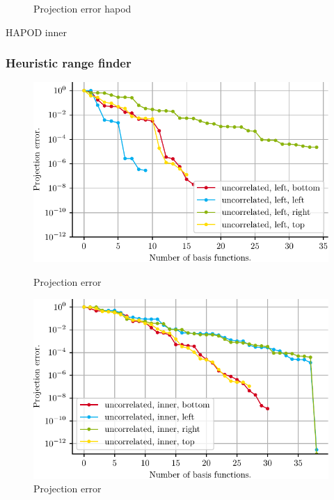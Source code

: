 \documentclass[a4paper]{eccomas_paper-2024}
\begin{document}
\begin{figure}[!htb]
  \caption{Projection error hapod}\label{fig:proj_error_right_hapod}
\endminipage
\end{figure}

\begin{table}
    \caption{HAPOD inner}\label{tab:hapod_inner}
    
\end{table}

\subsubsection{Heuristic range finder}

\begin{figure}[!htb]
  \includegraphics[width=\linewidth]{./figures/beam/fig_proj_error_left_heuristic.pdf}
  \caption{Projection error }\label{fig:proj_error_left_heuristic}
\endminipage\hfill
{}
  \includegraphics[width=\linewidth]{./figures/beam/fig_proj_error_inner_heuristic.pdf}
  \caption{Projection error }\label{fig:proj_error_inner_heuristic}

\end{figure}
\end{document}
